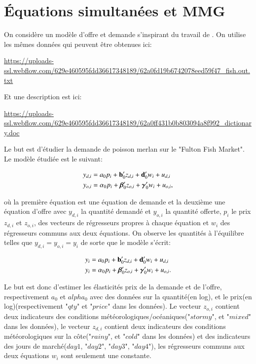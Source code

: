 \section{Équations simultanées et MMG}

On considère un modèle d'offre et demande s'inspirant du travail de \cite{angrist2000}. 
On utilise les mêmes données qui peuvent être obtenues ici:

\medskip

\url{https://uploads-ssl.webflow.com/629e460595fdd36617348189/62a0fd19b6742078eed59f47\_fish.out.txt}

\medskip

Et une description est ici:

\medskip

\url{https://uploads-ssl.webflow.com/629e460595fdd36617348189/62a0ff431b0b803094a8f992_dictionary.doc}

\medskip

Le but est d'étudier la demande de poisson merlan sur le "Fulton Fish Market". 
Le modèle étudiée est le suivant:

\begin{align*}
	y_{d, i} & = a_0 p_i + {\mathbf b}_0^\prime z_{d, i} +  {\mathbf d}_0^\prime w_i + u_{d, i}\\
	y_{o, i} & = \alpha_0 p_i + {\boldsymbol \beta}_0^\prime z_{o, i} + {\boldsymbol \gamma}_0^\prime w_i + u_{o, i},
\end{align*}

où la première équation est une équation de demande et la deuxième une équation d'offre avec $y_{d, i}$ la quantité demandé
et $y_{o, i}$ la quantité offerte, $p_i$ le prix $z_{d, i}$ et $z_{o, i}$, des 
vecteurs de régresseurs propres à chaque équation et $w_i$ des régresseurs communs aux deux équations.
On observe les quantités à l'équilibre telles que $y_{d, i} = y_{o, i} = y_i$ de sorte que le modèle
s'écrit:

\begin{align*}
	y_i & = a_0 p_i + {\mathbf b}_0^\prime z_{d, i} +  {\mathbf d}_0^\prime w_i + u_{d, i}\\
	y_i & = \alpha_0 p_i + {\boldsymbol \beta}_0^\prime z_{o, i} + {\boldsymbol \gamma}_0^\prime w_i + u_{o, i}.
\end{align*}

Le but est donc d'estimer les élasticités prix de la demande et de l'offre, respectivement $a_0$ et $alpha_0$ avec des
 données sur la quantité(en log), et le prix(en log)(respectivement "$qty$" et "$price$" dans les données).
Le vecteur $z_{o, i}$ contient deux indicateurs des conditions météorologiques/océaniques("$stormy$", et "$mixed$" 
dans les données), le vecteur $z_{d, i}$ contient deux indicateurs des conditions météorologiques 
sur la côte("$rainy$", et "$cold$" dans les données) et des indicateurs des jours de marché($day1$, "$day2$", 
"$day3$", "$day4$"), les régresseurs communs aux deux équations $w_i$ sont seulement une constante.

